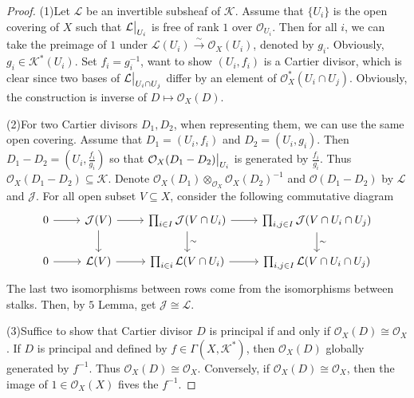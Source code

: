 \documentclass{ctexart}
\begin{document}
\begin{proof}
    (1)Let $\mathcal{L}$ be an invertible subsheaf of $\mathcal{K}$.
    Assume that $\{U_{i}\}$ is the open covering of $X$ such that $\mathcal{L}\big{|}_{U_{i}}$ is free of rank $1$ over $\mathcal{O}_{U_{i}}$.
    Then for all $i$, we can take the preimage of $1$ under $\mathcal{L}(U_{i}) \overset{\sim}{\longrightarrow} \mathcal{O}_{X}(U_{i})$, denoted by $g_{i}$.
    Obviously, $g_{i}\in \mathcal{K}^{\ast}(U_{i})$.
    Set $f_{i} = g_{i}^{-1}$, want to show $(U_{i}, f_{i})$ is a Cartier divisor, 
    which is clear since two bases of $\mathcal{L}\big{|}_{U_{i} \cap U_{j}}$ differ by an element of $\mathcal{O}_{X}^{\ast}(U_{i} \cap U_{j})$. 
    Obviously, the construction is inverse of $D \longmapsto \mathcal{O}_{X}(D)$.
    \par
    (2)For two Cartier divisors $D_{1}, D_{2}$, when representing them, we can use the same open covering.
    Assume that $D_{1} = (U_{i}, f_{i})$ and $D_{2} = (U_{i}, g_{i})$.
    Then $D_{1} - D_{2} = (U_{i}, \frac{f_{i}}{g_{i}})$ so that $\mathcal{O}_{X}(D_{1} - D_{2})\big{|}_{U_{i}}$ is generated by $\frac{f_{i}}{g_{i}}$.
    Thus $\mathcal{O}_{X}(D_{1} - D_{2}) \subseteq \mathcal{K}$.
    Denote $\mathcal{O}_{X}(D_{1}) \otimes_{\mathcal{O}_{X}} \mathcal{O}_{X}(D_{2})^{-1}$ and $\mathcal{O}(D_{1} - D_{2})$ by $\mathcal{L}$ and $\mathcal{J}$.
    For all open subset $V \subseteq X$, consider the following commutative diagram
    \begin{equation*}
        \begin{tikzcd}
            0 \arrow[r] & 
            \mathcal{J}(V) \arrow[r] \arrow[d] &
            \prod_{i\in I} \mathcal{J}(V \cap U_{i}) \arrow[r] \arrow[d, "\sim"] &
            \prod_{i,j\in I} \mathcal{J}(V \cap U_{i} \cap U_{j}) \arrow[d, "\sim"] \\
            0 \arrow[r] &
            \mathcal{L}(V) \arrow[r] &
            \prod_{i\in i} \mathcal{L}(V \cap U_{i}) \arrow[r] &
            \prod_{i,j\in I} \mathcal{L}(V \cap U_{i} \cap U_{j})
        \end{tikzcd}
    \end{equation*}
    The last two isomorphisms between rows come from the isomorphisms between stalks.
    Then, by $5$ Lemma, get $\mathcal{J} \cong \mathcal{L}$.
    \par
    (3)Suffice to show that Cartier divisor $D$ is principal if and only if $\mathcal{O}_{X}(D) \cong \mathcal{O}_{X}$.
    If $D$ is principal and defined by $f\in \Gamma(X, \mathcal{K}^{\ast})$, then $\mathcal{O}_{X}(D)$ globally generated by $f^{-1}$.
    Thus $\mathcal{O}_{X}(D) \cong \mathcal{O}_{X}$.
    Conversely, if $\mathcal{O}_{X}(D) \cong \mathcal{O}_{X}$, then the image of $1\in \mathcal{O}_{X}(X)$ fives the $f^{-1}$.
\end{proof}
\end{document}
